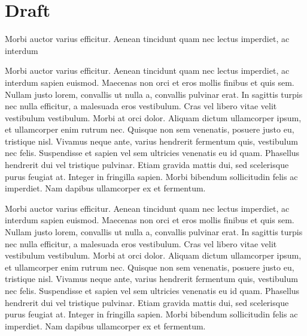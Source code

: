 \documentclass[12pt,a4paper]{article}
\begin{document}
\section{Draft}

\begin{cwdraft}
    Morbi auctor varius efficitur. Aenean tincidunt quam nec lectus imperdiet, ac interdum
\end{cwdraft}

\begin{cwdraft}
Morbi auctor varius efficitur. Aenean tincidunt quam nec lectus imperdiet, ac interdum sapien euismod. Maecenas non orci et eros mollis finibus et quis sem. Nullam justo lorem, convallis ut nulla a, convallis pulvinar erat. In sagittis turpis nec nulla efficitur, a malesuada eros vestibulum. Cras vel libero vitae velit vestibulum vestibulum. Morbi at orci dolor. Aliquam dictum ullamcorper ipsum, et ullamcorper enim rutrum nec. Quisque non sem venenatis, posuere justo eu, tristique nisl. Vivamus neque ante, varius hendrerit fermentum quis, vestibulum nec felis. Suspendisse et sapien vel sem ultricies venenatis eu id quam. Phasellus hendrerit dui vel tristique pulvinar. Etiam gravida mattis dui, sed scelerisque purus feugiat at. Integer in fringilla sapien. Morbi bibendum sollicitudin felis ac imperdiet. Nam dapibus ullamcorper ex et fermentum.
\end{cwdraft}

\begin{cwdraft}[A draft]
    Morbi auctor varius efficitur. Aenean tincidunt quam nec lectus imperdiet, ac interdum sapien euismod. Maecenas non orci et eros mollis finibus et quis sem. Nullam justo lorem, convallis ut nulla a, convallis pulvinar erat. In sagittis turpis nec nulla efficitur, a malesuada eros vestibulum. Cras vel libero vitae velit vestibulum vestibulum. Morbi at orci dolor. Aliquam dictum ullamcorper ipsum, et ullamcorper enim rutrum nec. Quisque non sem venenatis, posuere justo eu, tristique nisl. Vivamus neque ante, varius hendrerit fermentum quis, vestibulum nec felis. Suspendisse et sapien vel sem ultricies venenatis eu id quam. Phasellus hendrerit dui vel tristique pulvinar. Etiam gravida mattis dui, sed scelerisque purus feugiat at. Integer in fringilla sapien. Morbi bibendum sollicitudin felis ac imperdiet. Nam dapibus ullamcorper ex et fermentum.
\end{cwdraft}
\end{document}
